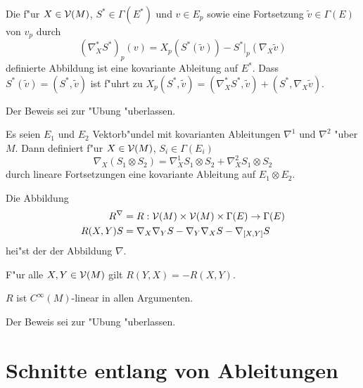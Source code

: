 \begin{Prop}\label{prop-7-3}
  Die f"ur $X \in \operatorname{\mathcal{V}}(M)$, $S^* \in \Gamma(E^*)$ und $v \in E_p$ sowie eine Fortsetzung $\tilde v \in \Gamma(E)$ von $v_p$ durch
  \[ (\nabla_X^* S^*)_p(v) = X_p(S^*(\tilde v)) - S^*|_p (\nabla_X \tilde v) \]
  definierte Abbildung ist eine kovariante Ableitung auf $E^*$.
  Dass $S^*(\tilde v) = (S^*, \tilde v)$ ist f"uhrt zu $X_p(S^*, \tilde v) = (\nabla_X^* S^*, \tilde v) + (S^*, \nabla_X \tilde v)$.
\end{Prop}
Der Beweis sei zur "Ubung "uberlassen.

\begin{Prop}
  Es seien $E_1$ und $E_2$ Vektorb"undel mit kovarianten Ableitungen  $\nabla^1$ und $\nabla^2$ "uber $M$. 
  Dann definiert f"ur $X \in \operatorname{\mathcal{V}}(M)$, $S_i \in \Gamma(E_i)$
  \[ \nabla_X (S_1 \otimes S_2) = \nabla_X^1 S_1 \otimes S_2 + \nabla_X^2 S_1 \otimes S_2 \]
  durch lineare Fortsetzungen eine kovariante Ableitung auf $E_1 \otimes E_2$.
\end{Prop}

\begin{Dfn}
  Die Abbildung
  \begin{align*}
    R^\nabla & = R : \operatorname{\mathcal{V}}(M) \times \operatorname{\mathcal{V}}(M) \times \Gamma(E) \to \Gamma(E)\\
    R(X,Y)S & = \nabla_X \nabla_Y S - \nabla_Y \nabla_X S - \nabla_{[X,Y]} S
  \end{align*}
  hei"st der  der Abbildung $\nabla$.
\end{Dfn}

\begin{bem}
  F"ur alle $X, Y \in \operatorname{\mathcal{V}}(M)$ gilt $R(Y,X) = - R(X,Y)$.
\end{bem}

\begin{Prop}
  $R$ ist $C^\infty(M)$-linear in allen Argumenten.
\end{Prop}
Der Beweis sei zur "Ubung "uberlassen.


\section{Schnitte entlang von Ableitungen}

